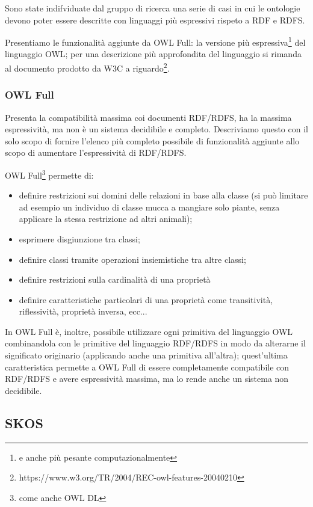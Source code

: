 Sono state indifviduate dal gruppo di ricerca  una serie di casi in cui le ontologie devono poter essere descritte con linguaggi più espressivi rispeto a RDF e RDFS\cite{antoniou2009web}.

Presentiamo le funzionalità aggiunte da OWL Full: la versione più espressiva\footnote{e anche più pesante computazionalmente} del linguaggio OWL; per una descrizione più approfondita del linguaggio si rimanda al documento prodotto da W3C a riguardo\footnote{https://www.w3.org/TR/2004/REC-owl-features-20040210}.
\subsubsection{OWL Full}
Presenta la compatibilità massima coi documenti RDF/RDFS, ha la massima espressività, ma non è un sistema decidibile e completo. Descriviamo questo con il solo scopo di fornire l'elenco più completo possibile di funzionalità aggiunte allo scopo di aumentare l'espressività di RDF/RDFS.

OWL Full\footnote{come anche OWL DL} permette di:
\begin{itemize}
	\item definire restrizioni sui domini delle relazioni in base alla classe (si può limitare ad esempio un individuo di classe mucca a mangiare solo piante, senza applicare la stessa restrizione ad altri animali);
	\item esprimere disgiunzione tra classi;
	\item definire classi tramite operazioni insiemistiche tra altre classi;
	\item definire restrizioni sulla cardinalità di una proprietà
	\item definire caratteristiche particolari di una proprietà come transitività, riflessività, proprietà inversa, ecc...
\end{itemize}

In OWL Full è, inoltre, possibile utilizzare ogni primitiva del linguaggio OWL combinandola con le primitive del linguaggio RDF/RDFS in modo da alterarne il significato originario (applicando anche una primitiva all'altra); quest'ultima caratteristica permette a OWL Full di essere completamente compatibile con RDF/RDFS e avere espressività massima, ma lo rende anche un sistema non decidibile.
\subsection{SKOS}
